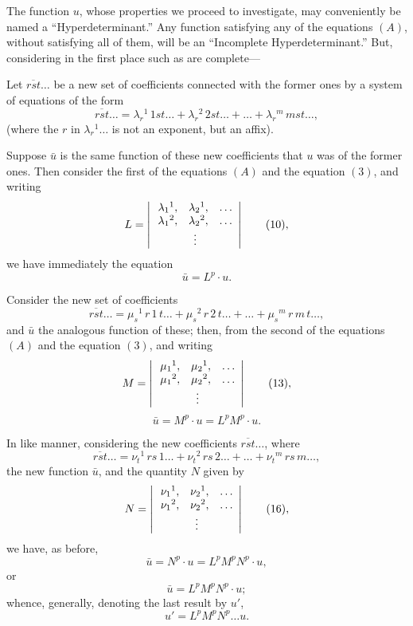 \documentclass[11pt]{article}
\begin{document}
The function $u$, whose properties we proceed to investigate, may conveniently be
named a ``Hyperdeterminant.'' Any function satisfying any of the equations $(A)$,
without satisfying all of them, will be an ``Incomplete Hyperdeterminant.'' But, considering
in the first place such as are complete---

Let $\overline{rst}\ldots$ be a new set of coefficients connected with the former ones by a system
of equations of the form
\[
\overline{rst}\ldots = \lambda_r{}^1\,1st\ldots + \lambda_r{}^2\,2st\ldots + \ldots + \lambda_r{}^m\,mst\ldots \tag{9},
\]
(where the $r$ in $\lambda_r{}^1\ldots$ is not an exponent, but an affix).

Suppose $\bar{u}$ is the same function of these new coefficients that $u$ was of the former
ones. Then consider the first of the equations $(A)$ and the equation $(3)$, and writing
\[
L = \left|\,
\begin{array}{ccc}
\lambda_1{}^1, & \lambda_2{}^1, & \ldots\\
\lambda_1{}^2, & \lambda_2{}^2, & \ldots\\
\multicolumn{3}{c}{\vdots}
\end{array}
\right| \tag{10},
\]
we have immediately the equation
\[
\bar{u} = L^p \cdot u \tag{11}.
\]

Consider the new set of coefficients
\[
\overline{rst}\ldots = \mu_s{}^1\,r\,1\,t\ldots + \mu_s{}^2\,r\,2\,t\ldots + \ldots + \mu_s{}^m\,r\,m\,t\ldots \tag{12},
\]
and $\bar{u}$ the analogous function of these; then, from the second of the equations $(A)$
and the equation $(3)$, and writing
\[
M = \left|\,
\begin{array}{ccc}
\mu_1{}^1, & \mu_2{}^1, & \ldots\\
\mu_1{}^2, & \mu_2{}^2, & \ldots\\
\multicolumn{3}{c}{\vdots}
\end{array}
\right| \tag{13},
\]
\[
\bar{u} = M^p \cdot u = L^p M^p \cdot u \tag{14}.
\]

In like manner, considering the new coefficients $\overline{rst}\ldots$, where
\[
\overline{rst}\ldots = \nu_t{}^1\,rs\,1\ldots + \nu_t{}^2\,rs\,2\ldots + \ldots + \nu_t{}^m\,rs\,m\ldots \tag{15},
\]
the new function $\bar{u}$, and the quantity $N$ given by
\[
N = \left|\,
\begin{array}{ccc}
\nu_1{}^1, & \nu_2{}^1, & \ldots\\
\nu_1{}^2, & \nu_2{}^2, & \ldots\\
\multicolumn{3}{c}{\vdots}
\end{array}
\right| \tag{16},
\]
we have, as before,
\[
\bar{u} = N^p \cdot u = L^p M^p N^p \cdot u \tag{17},
\]
or
\[
\bar{u} = L^p M^p N^p \cdot u \tag{18};
\]
whence, generally, denoting the last result by $u'$,
\[
u' = L^p M^p N^p \ldots u \tag{B, 1}.
\]
\end{document}
